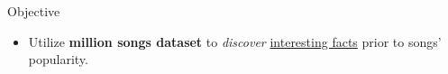 \documentclass[final]{beamer}
\newlength{\sepwid}
\newlength{\onecolwid}
\begin{document}
\setlength{\belowcaptionskip}{2ex} %
\setlength\belowdisplayshortskip{2ex} %
\begin{frame} %

  \begin{columns}
   \begin{column}{\linewidth}
    \vskip1cm
    \centering
    \vskip1cm
   \end{column}
   \vspace{1cm}
  \end{columns}
 \vspace{1cm}


\begin{columns}[t] %

\begin{column}{\sepwid}\end{column} %

\begin{column}{\onecolwid} %


\begin{exampleblock}{Objective}
\begin{itemize}
\item Utilize \textbf{million songs dataset} to \textit{discover} \underline{interesting facts} prior to songs' popularity.
\end{itemize}


\end{exampleblock}
\end{column}
\end{columns}
\end{frame}
\end{document}
